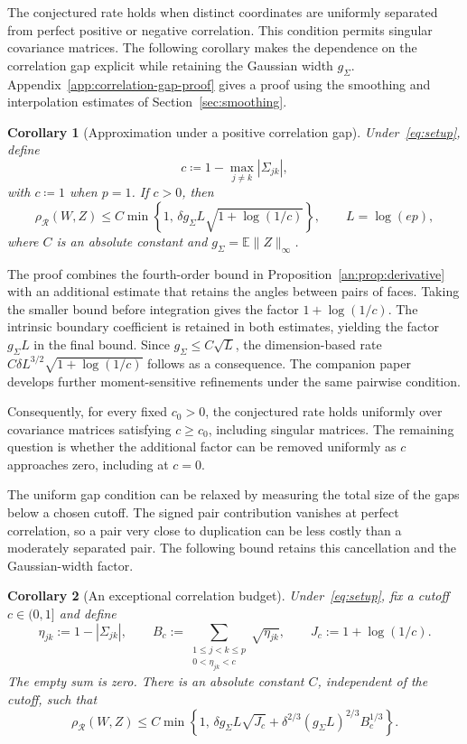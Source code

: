 \documentclass[11pt,letterpaper]{article}
\newtheorem{corollary}{Corollary}
\theoremstyle{remark}
\newcommand{\E}{\mathbb E}
\newcommand{\rh}{\rho_{\mathcal R}}
\begin{document}
{
The conjectured rate holds when distinct coordinates are uniformly
separated from perfect positive or negative correlation. This condition
permits singular covariance matrices. The following corollary makes the
dependence on the correlation gap explicit while retaining the Gaussian
width $g_\Sigma$. Appendix~\ref{app:correlation-gap-proof} gives a proof using the smoothing
and interpolation estimates of Section~\ref{sec:smoothing}.

\begin{samepage}
\begin{corollary}[Approximation under a positive correlation gap]
\label{cor:positive-correlation-gap}
Under~\eqref{eq:setup}, define
\[
 c\coloneqq 1-\max_{j\ne k}|\Sigma_{jk}|,
\]
with \(c\coloneqq 1\) when \(p=1\). If \(c>0\), then
\[
 \rh(W,Z)\le C\min\left\{1,\,
 \delta g_\Sigma L\sqrt{1+\log(1/c)}\right\},
 \qquad L=\log(ep),
\]
where \(C\) is an absolute constant and $g_\Sigma=\E\|Z\|_\infty$.
\end{corollary}
\end{samepage}

The proof combines the fourth-order bound in
Proposition~\ref{an:prop:derivative} with an additional estimate that
retains the angles between pairs of faces. Taking the smaller bound
before integration gives the factor \(1+\log(1/c)\). The intrinsic
boundary coefficient is retained in both estimates, yielding the factor
$g_\Sigma L$ in the final bound. Since $g_\Sigma\le C\sqrt L$, the
dimension-based rate $C\delta L^{3/2}\sqrt{1+\log(1/c)}$ follows as a
consequence. The companion paper~\cite{CorrelationGap} develops further
moment-sensitive refinements under the same pairwise condition.

Consequently, for every fixed \(c_0>0\), the conjectured rate holds
uniformly over covariance matrices satisfying \(c\ge c_0\), including
singular matrices. The remaining question is whether the additional
factor can be removed uniformly as \(c\) approaches zero, including at
\(c=0\).
}

The uniform gap condition can be relaxed by measuring the total size of
the gaps below a chosen cutoff. The signed pair contribution vanishes
at perfect correlation, so a pair very close to duplication can be
less costly than a moderately separated pair. The following bound
retains this cancellation and the Gaussian-width factor.

\begin{corollary}[An exceptional correlation budget]
\label{cor:correlation-budget}
Under~\eqref{eq:setup}, fix a cutoff $c\in(0,1]$ and define
\[
 \eta_{jk}:=1-|\Sigma_{jk}|,\qquad
 B_c:=\sum_{\substack{1\le j<k\le p\\0<\eta_{jk}<c}}\sqrt{\eta_{jk}},
 \qquad J_c:=1+\log(1/c).
\]
The empty sum is zero. There is an absolute constant $C$, independent
of the cutoff, such that
\begin{equation}
 \rh(W,Z)\le C\min\left\{1,\,
      \delta g_\Sigma L\sqrt{J_c}
      +\delta^{2/3}(g_\Sigma L)^{2/3}B_c^{1/3}\right\}.
 \label{budget:eq:result}
\end{equation}
\end{corollary}
\end{document}
